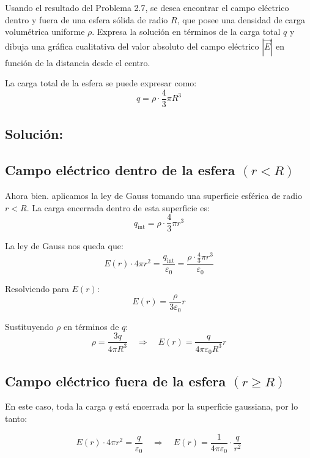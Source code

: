 \documentclass[12pt]{article}
\begin{document}
Usando el resultado del Problema 2.7, se desea encontrar el campo eléctrico dentro y fuera de una esfera sólida de radio \( R \), que posee una densidad de carga volumétrica uniforme \( \rho \). Expresa la solución en términos de la carga total \( q \) y dibuja una gráfica cualitativa del valor absoluto del campo eléctrico \( |\vec{E}| \) en función de la distancia desde el centro.

\vspace{0.3cm}
La carga total de la esfera se puede expresar como:
\[
q = \rho \cdot \frac{4}{3} \pi R^3
\]

\subsection*{Solución:}

\subsection*{Campo eléctrico dentro de la esfera \((r < R)\)}

Ahora bien. aplicamos la ley de Gauss tomando una superficie esférica de radio \( r < R \). La carga encerrada dentro de esta superficie es:
\[
q_{\text{int}} = \rho \cdot \frac{4}{3} \pi r^3
\]

La ley de Gauss nos queda que:
\[
E(r) \cdot 4\pi r^2 = \frac{q_{\text{int}}}{\varepsilon_0} = \frac{\rho \cdot \frac{4}{3} \pi r^3}{\varepsilon_0}
\]

Resolviendo para \( E(r) \):
\[
E(r) = \frac{\rho}{3 \varepsilon_0} r
\]

Sustituyendo \( \rho \) en términos de \( q \):
\[
\rho = \frac{3q}{4\pi R^3} \quad \Rightarrow \quad E(r) = \frac{q}{4\pi \varepsilon_0 R^3} r
\]

\subsection*{Campo eléctrico fuera de la esfera \((r \geq R)\)}

En este caso, toda la carga \( q \) está encerrada por la superficie gaussiana, por lo tanto:

\[
E(r) \cdot 4\pi r^2 = \frac{q}{\varepsilon_0}
\quad \Rightarrow \quad
E(r) = \frac{1}{4\pi \varepsilon_0} \cdot \frac{q}{r^2}
\]
\end{document}

